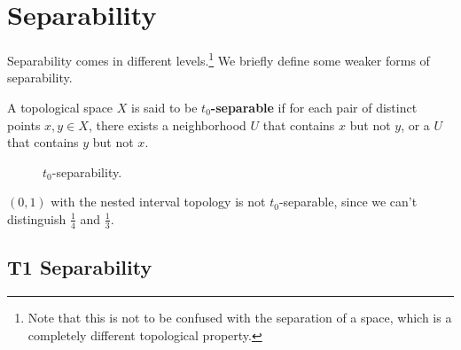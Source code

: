 \section{Separability}

  Separability comes in different levels.\footnote{Note that this is not to be confused with the separation of a space, which is a completely different topological property.} We briefly define some weaker forms of separability. 
  
  \begin{definition}[$t_0$-Separability]
    A topological space $X$ is said to be \textbf{$t_0$-separable} if for each pair of distinct points $x, y \in X$, there exists a neighborhood $U$ that contains $x$ but not $y$, or a $U$ that contains $y$ but not $x$. 

    \begin{figure}[H]
      \centering 
      \caption{$t_0$-separability. } 
      \label{fig:t0_separability}
    \end{figure}
  \end{definition}

  \begin{example}
    $(0,1)$ with the nested interval topology is not $t_0$-separable, since we can't distinguish $\frac{1}{4}$ and $\frac{1}{3}$.
  \end{example}

\subsection{T1 Separability}

